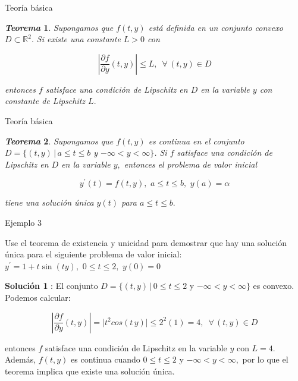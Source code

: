 \documentclass{beamer}
\newtheorem{teorema}{\textit{\textbf{Teorema}}}
\begin{document}
\begin{frame}{Teoría básica}
	\begin{teorema}
		Supongamos que $ f (t, y) $ est\'a definida en un conjunto convexo $ D \subset \mathbb{R}^2. $ Si existe una constante $ L > 0 $ con
		
		\begin{displaymath}
		\left\vert \frac{\partial f}{\partial y} (t, y) \right\vert \leq L, \,\,\, \forall \, (t, y) \in D
		\end{displaymath}
		
		entonces $ f $ satisface una condici\'on de Lipschitz en $ D $ en la variable $y$ con constante de Lipschitz $ L. $
	\end{teorema}
\end{frame}

\begin{frame}{Teoría básica}
	\begin{teorema}
		
Supongamos que $ f (t, y) $ es continua en el conjunto $ D = \{(t, y) \, \vert \, a \leq t \leq b$ y $- \infty < y < \infty \}$. Si $ f $ satisface una condici\'on de Lipschitz en $ D $ en la variable $ y, $ entonces el problema de valor inicial

\begin{displaymath}
y^\prime(t) = f(t,y), \,\, a \leq t \leq b, \,\,  y (a) = \alpha
\end{displaymath}

tiene una soluci\'on \'unica $y (t) $ para $ a \leq t \leq b. $
		
	\end{teorema}
\end{frame}

\begin{frame}{Ejemplo 3}
	
	\begin{block}{}
		Use el teorema de existencia y unicidad para demostrar que hay una soluci\'on \'unica para el siguiente problema de valor inicial:
		$	y^\prime = 1 + t \sin (ty), \,\, 0 \leq t \leq 2, \,\,  y (0) = 0 $
	\end{block}		

\pause
	
	{\small \textbf{Soluci\'on 1} : El conjunto 
		$ D = \{(t, y) \, \vert \, 0 \leq t \leq 2$ y $- \infty < y < \infty \}$ es convexo. Podemos calcular:
		
		\begin{displaymath}
		\left\vert \frac{\partial f}{\partial y} (t, y) \right\vert = \vert t^2 cos(t \, y) \vert \leq 2^2 (1) = 4, \,\,\, \forall \, (t, y) \in D
		\end{displaymath}		
		
		entonces $ f $ satisface una condici\'on de Lipschitz en la variable $y$ con $ L = 4. $ Adem\'as, $ f (t, y) $ es continua cuando $ 0 \leq t \leq 2 $ y $ - \infty < y < \infty, $ por lo que el teorema implica que existe una soluci\'on \'unica. }
	
\end{frame}
\end{document}
